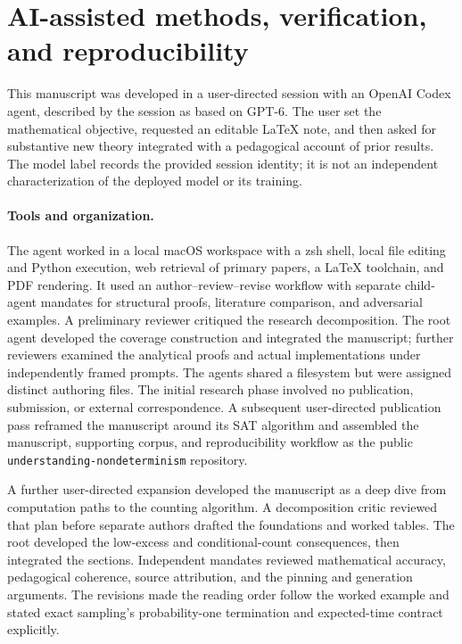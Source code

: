 \section{AI-assisted methods, verification, and reproducibility}
\label{sec:methods}

This manuscript was developed in a user-directed session with an OpenAI
Codex agent, described by the session as based on GPT-6. The user set
the mathematical objective, requested an editable \LaTeX{} note, and
then asked for substantive new theory integrated with a pedagogical
account of prior results. The model label records the provided session
identity; it is not an independent characterization of the deployed
model or its training.

\paragraph{Tools and organization.}
The agent worked in a local macOS workspace with a zsh shell, local file
editing and Python execution, web retrieval of primary papers, a
\LaTeX{} toolchain, and PDF rendering. It used an author--review--revise
workflow with separate child-agent mandates for structural proofs,
literature comparison, and adversarial examples. A preliminary reviewer
critiqued the research decomposition. The root agent developed the
coverage construction and integrated the manuscript; further reviewers
examined the analytical proofs and actual implementations under
independently framed prompts. The agents shared a filesystem but were
assigned distinct authoring files. The initial research phase involved no publication, submission, or
external correspondence. A subsequent user-directed publication pass
reframed the manuscript around its SAT algorithm and assembled the
manuscript, supporting corpus, and reproducibility workflow as the
public \texttt{understanding-nondeterminism} repository.

A further user-directed expansion developed the manuscript as a deep dive
from computation paths to the counting algorithm. A decomposition critic
reviewed that plan before separate authors drafted the foundations and
worked tables. The root developed the low-excess and conditional-count
consequences, then integrated the sections. Independent mandates reviewed
mathematical accuracy, pedagogical coherence, source attribution, and the
pinning and generation arguments. The revisions made the reading order
follow the worked example and stated exact sampling's probability-one
termination and expected-time contract explicitly.

